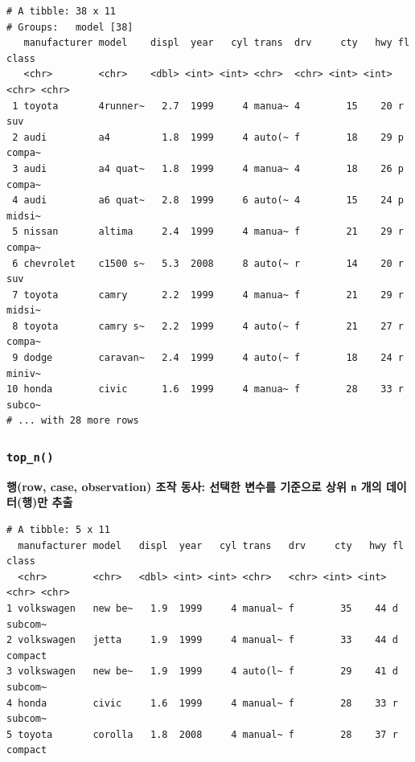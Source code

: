 \documentclass[
  11pt,
]{krantz}
\makeatletter
\newenvironment{Shaded}{\begin{snugshade}}{\end{snugshade}}
\newcommand{\CommentTok}[1]{\textcolor[rgb]{0.37,0.37,0.37}{\textit{#1}}}
\newcommand{\DecValTok}[1]{\textcolor[rgb]{0.06,0.06,0.06}{#1}}
\newcommand{\KeywordTok}[1]{\textcolor[rgb]{0.27,0.27,0.27}{\textbf{#1}}}
\newcommand{\NormalTok}[1]{#1}
\newcommand{\OperatorTok}[1]{\textcolor[rgb]{0.43,0.43,0.43}{\textbf{#1}}}
\newcommand{\StringTok}[1]{\textcolor[rgb]{0.5,0.5,0.5}{#1}}
\newenvironment{kframe}{%
\medskip{}
\setlength{\fboxsep}{.8em}
 \def\at@end@of@kframe{}%
 \ifinner\ifhmode%
  \def\at@end@of@kframe{\end{minipage}}%
  \begin{minipage}{\columnwidth}%
 \fi\fi%
 \def\FrameCommand##1{\hskip\@totalleftmargin \hskip-\fboxsep
 \colorbox{shadecolor}{##1}\hskip-\fboxsep
     \hskip-\linewidth \hskip-\@totalleftmargin \hskip\columnwidth}%
 \MakeFramed {\advance\hsize-\width
   \@totalleftmargin\z@ \linewidth\hsize
   \@setminipage}}%
 {\par\unskip\endMakeFramed%
 \at@end@of@kframe}
\renewenvironment{quote}{\begin{kframe}}{\end{kframe}}
\makeatother
\begin{document}
\begin{verbatim}
# A tibble: 38 x 11
# Groups:   model [38]
   manufacturer model    displ  year   cyl trans  drv     cty   hwy fl    class 
   <chr>        <chr>    <dbl> <int> <int> <chr>  <chr> <int> <int> <chr> <chr> 
 1 toyota       4runner~   2.7  1999     4 manua~ 4        15    20 r     suv   
 2 audi         a4         1.8  1999     4 auto(~ f        18    29 p     compa~
 3 audi         a4 quat~   1.8  1999     4 manua~ 4        18    26 p     compa~
 4 audi         a6 quat~   2.8  1999     6 auto(~ 4        15    24 p     midsi~
 5 nissan       altima     2.4  1999     4 manua~ f        21    29 r     compa~
 6 chevrolet    c1500 s~   5.3  2008     8 auto(~ r        14    20 r     suv   
 7 toyota       camry      2.2  1999     4 manua~ f        21    29 r     midsi~
 8 toyota       camry s~   2.2  1999     4 auto(~ f        21    27 r     compa~
 9 dodge        caravan~   2.4  1999     4 auto(~ f        18    24 r     miniv~
10 honda        civic      1.6  1999     4 manua~ f        28    33 r     subco~
# ... with 28 more rows
\end{verbatim}

\normalsize

\hypertarget{dplyr-topn}{%
\subsubsection*{\texorpdfstring{\texttt{top\_n()}}{top\_n()}}\label{dplyr-topn}}


\begin{quote}
\textbf{행(row, case, observation) 조작 동사: 선택한 변수를 기준으로 상위 \texttt{n} 개의 데이터(행)만 추출}
\end{quote}

\footnotesize

\begin{Shaded}
\end{Shaded}

\begin{verbatim}
# A tibble: 5 x 11
  manufacturer model   displ  year   cyl trans   drv     cty   hwy fl    class  
  <chr>        <chr>   <dbl> <int> <int> <chr>   <chr> <int> <int> <chr> <chr>  
1 volkswagen   new be~   1.9  1999     4 manual~ f        35    44 d     subcom~
2 volkswagen   jetta     1.9  1999     4 manual~ f        33    44 d     compact
3 volkswagen   new be~   1.9  1999     4 auto(l~ f        29    41 d     subcom~
4 honda        civic     1.6  1999     4 manual~ f        28    33 r     subcom~
5 toyota       corolla   1.8  2008     4 manual~ f        28    37 r     compact
\end{verbatim}
\end{document}
